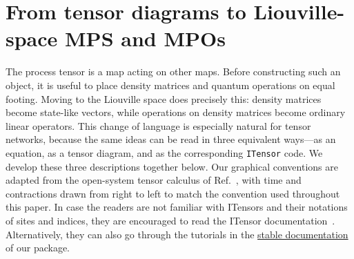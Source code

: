 \section{From tensor diagrams to Liouville-space MPS and MPOs}
\label{sec:liouville-foundations}

The process tensor is a map acting on other maps.
Before constructing such an object, it is useful to place density matrices and quantum operations on equal footing.
Moving to the Liouville space does precisely this: density matrices become state-like vectors, while operations on density matrices become ordinary linear operators.
This change of language is especially natural for tensor networks, because the same ideas can be read in three equivalent ways---as an equation, as a tensor diagram, and as the corresponding \texttt{ITensor} code.
We develop these three descriptions together below.
Our graphical conventions are adapted from the open-system tensor calculus of Ref.~\cite{Wood2015}, with time and contractions drawn from right to left to match the convention used throughout this paper.
In case the readers are not familiar with ITensors and their notations of sites and indices, they are encouraged to read the ITensor documentation~\cite{Fishman2022,ITensorsDocs,ITensorMPSDocs}.
Alternatively, they can also go through the tutorials in the \href{https://gauthameshwar.github.io/ProcessTensors.jl/stable/}{stable documentation} of our package.

\label{subsec:graphical-dictionary}

